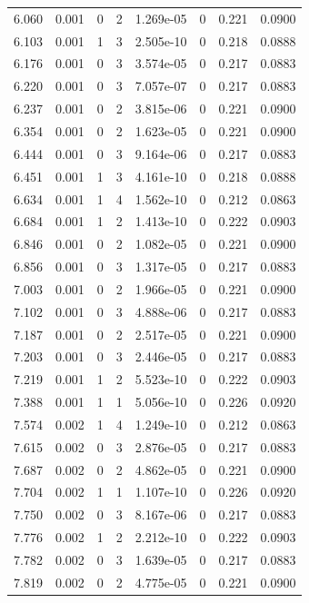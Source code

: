 \documentclass[preview]{standalone}
\begin{document}
{{{\begin{tabular}{L{1.2cm}C{1.2cm} C{0.3cm}C{0.5cm} C{1.4cm}C{1.4cm} C{1.4cm}C{1.4cm}}
  6.060  &  0.001  & 0     &  2 &  1.269e-05  & 0  & 0.221 &  0.0900   \\ 
  6.103  &  0.001  & 1     &  3 &  2.505e-10  & 0  & 0.218 &  0.0888   \\ 
  6.176  &  0.001  & 0     &  3 &  3.574e-05  & 0  & 0.217 &  0.0883   \\ 
  6.220  &  0.001  & 0     &  3 &  7.057e-07  & 0  & 0.217 &  0.0883   \\ 
  6.237  &  0.001  & 0     &  2 &  3.815e-06  & 0  & 0.221 &  0.0900   \\ 
  6.354  &  0.001  & 0     &  2 &  1.623e-05  & 0  & 0.221 &  0.0900   \\ 
  6.444  &  0.001  & 0     &  3 &  9.164e-06  & 0  & 0.217 &  0.0883   \\ 
  6.451  &  0.001  & 1     &  3 &  4.161e-10  & 0  & 0.218 &  0.0888   \\ 
  6.634  &  0.001  & 1     &  4 &  1.562e-10  & 0  & 0.212 &  0.0863   \\ 
  6.684  &  0.001  & 1     &  2 &  1.413e-10  & 0  & 0.222 &  0.0903   \\ 
  6.846  &  0.001  & 0     &  2 &  1.082e-05  & 0  & 0.221 &  0.0900   \\ 
  6.856  &  0.001  & 0     &  3 &  1.317e-05  & 0  & 0.217 &  0.0883   \\ 
  7.003  &  0.001  & 0     &  2 &  1.966e-05  & 0  & 0.221 &  0.0900   \\ 
  7.102  &  0.001  & 0     &  3 &  4.888e-06  & 0  & 0.217 &  0.0883   \\ 
  7.187  &  0.001  & 0     &  2 &  2.517e-05  & 0  & 0.221 &  0.0900   \\ 
  7.203  &  0.001  & 0     &  3 &  2.446e-05  & 0  & 0.217 &  0.0883   \\ 
  7.219  &  0.001  & 1     &  2 &  5.523e-10  & 0  & 0.222 &  0.0903   \\ 
  7.388  &  0.001  & 1     &  1 &  5.056e-10  & 0  & 0.226 &  0.0920   \\ 
  7.574  &  0.002  & 1     &  4 &  1.249e-10  & 0  & 0.212 &  0.0863   \\ 
  7.615  &  0.002  & 0     &  3 &  2.876e-05  & 0  & 0.217 &  0.0883   \\ 
  7.687  &  0.002  & 0     &  2 &  4.862e-05  & 0  & 0.221 &  0.0900   \\ 
  7.704  &  0.002  & 1     &  1 &  1.107e-10  & 0  & 0.226 &  0.0920   \\ 
  7.750  &  0.002  & 0     &  3 &  8.167e-06  & 0  & 0.217 &  0.0883   \\ 
  7.776  &  0.002  & 1     &  2 &  2.212e-10  & 0  & 0.222 &  0.0903   \\ 
  7.782  &  0.002  & 0     &  3 &  1.639e-05  & 0  & 0.217 &  0.0883   \\ 
  7.819  &  0.002  & 0     &  2 &  4.775e-05  & 0  & 0.221 &  0.0900   \\ 
\hline 
\end{tabular} 

}}}
\end{document}
